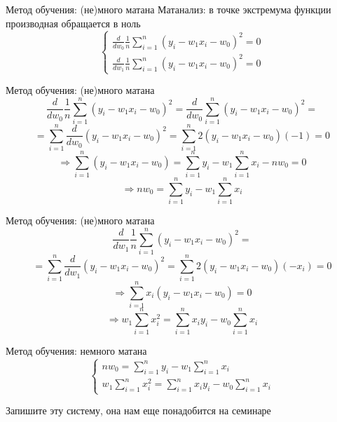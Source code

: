 \documentclass[aspectratio=169]{beamer}
\begin{document}
\begin{frame}{Метод обучения: (не)много матана}
    Матанализ: в точке экстремума функции производная обращается в ноль
    {\LARGE \[
        \begin{cases}
            \frac{d}{dw_0} \frac{1}{n} \sum_{i=1}^n {(y_i - w_1 x_i - w_0)}^2 = 0 \\
            \frac{d}{dw_1} \frac{1}{n} \sum_{i=1}^n {(y_i - w_1 x_i - w_0)}^2 = 0 
        \end{cases}
    \]}
\end{frame}

\begin{frame}{Метод обучения: (не)много матана}
    \large
    \[
        \frac{d}{dw_0} \frac{1}{n} \sum_{i=1}^n {(y_i - w_1 x_i - w_0)}^2 =
        \frac{d}{dw_0} \sum_{i=1}^n {(y_i - w_1 x_i - w_0)}^2 =
    \]
    \pause
    \[
        = \sum_{i=1}^n \frac{d}{dw_0} {(y_i - w_1 x_i - w_0)}^2 =
        \sum_{i=1}^n 2 {(y_i - w_1 x_i - w_0)(-1)} = 0
    \]
    \pause
    \[
        \Rightarrow \sum_{i=1}^n (y_i - w_1 x_i - w_0) =
        \sum_{i=1}^n y_i - w_1 \sum_{i=1}^n x_i - n w_0 = 0
    \]
    \pause
    \[
        \Rightarrow n w_0 = \sum_{i=1}^n y_i - w_1 \sum_{i=1}^n x_i
    \]
\end{frame}

\begin{frame}{Метод обучения: (не)много матана}
    \large
    \[ \frac{d}{dw_1} \frac{1}{n} \sum_{i=1}^n {(y_i - w_1 x_i - w_0)}^2 = \]
    \pause
    \[
        = \sum_{i=1}^n \frac{d}{dw_1} {(y_i - w_1 x_i - w_0)}^2 =
        \sum_{i=1}^n 2 {(y_i - w_1 x_i - w_0)(-x_i)} = 0
    \]
    \pause
    \[
        \Rightarrow \sum_{i=1}^n x_i {(y_i - w_1 x_i - w_0)} = 0 
    \]
    \pause
    \[
        \Rightarrow w_1 \sum_{i=1}^n x_i^2 = \sum_{i=1}^n x_i y_i -
        w_0 \sum_{i=1}^n x_i   
    \]
\end{frame}

\begin{frame}{Метод обучения: немного матана}
    \LARGE
    \[
        \begin{cases}
            n w_0 = \sum_{i=1}^n y_i - w_1 \sum_{i=1}^n x_i \\
            w_1 \sum_{i=1}^n x_i^2 = \sum_{i=1}^n x_i y_i -
            w_0 \sum_{i=1}^n x_i
        \end{cases}
    \]

    {\large Запишите эту систему, она нам еще понадобится на семинаре}
\end{frame}
\end{document}
